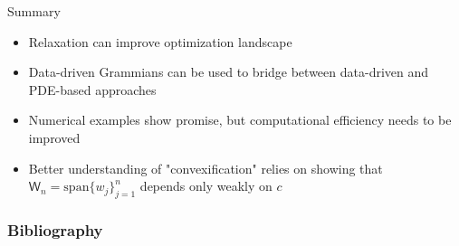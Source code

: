 \documentclass{beamer}
\begin{document}
\begin{frame}{Summary}
\begin{itemize}
  \item Relaxation can improve optimization landscape
  \item Data-driven Grammians can be used to bridge between data-driven and PDE-based approaches
  \item Numerical examples show promise, but computational efficiency needs to be improved
  \item Better understanding of "convexification" relies on showing that $\mathsf{W}_n = \text{span}\{w_j\}_{j=1}^n$ depends only weakly on $c$
\end{itemize}
\end{frame}


\begin{frame}
  \frametitle{Bibliography}
  \printbibliography %
\end{frame}
\end{document}
